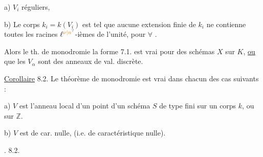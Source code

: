 a)  $V_i$   réguliers,  

b) Le corps  $k_i=k(V_i)$ est tel que aucune extension finie de $k_i$ ne contienne toutes les racines $\ell^{\unsure{\nu|n}}$-ièmes de l'unité, pour $\forall$ .

Alors le th. de monodromie  la forme 7.1. est vrai pour des schémas   $X$ sur $K$,    \uline{ou} que les $V_\alpha$ sont des anneaux de val. discrète.

\uline{Corollaire} 8.2. Le théorème de monodromie  est vrai   dans chacun des cas suivants :

a) $V$ est  l'anneau local d'un point d'un schéma $S$ de type fini sur un corps $k$, ou sur   $\mathbb Z$.

b) $V$ est de car. nulle, (i.e.  de caractéristique  nulle).

. 8.2.

